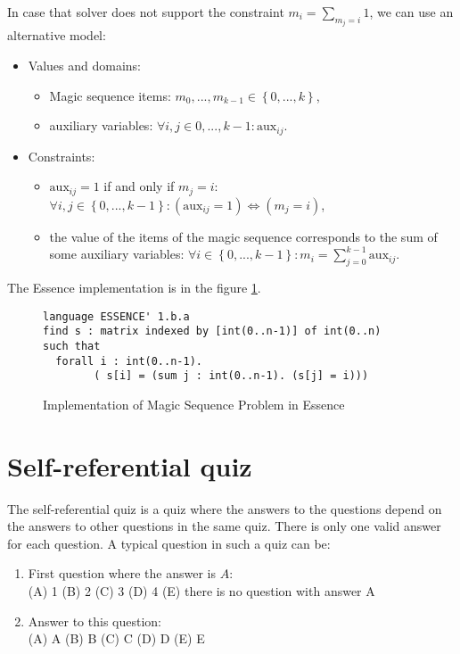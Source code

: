 In case that solver does not support the constraint $m_i = \sum_{m_j = i}{1}$, we 
can use an alternative model: 

\begin{itemize}
	\item Values and domains:
  \begin{itemize} 
	 \item Magic sequence items: $m_0, ..., m_{k-1} \in \left\{0, ..., k\right\}$,
	 \item auxiliary variables: $\forall i,j \in {0, ..., k-1}: \mathrm{aux}_{ij}$.
	\end{itemize}
	\item Constraints:
	 \begin{itemize}
    \item $\mathrm{aux}_{ij} = 1$ if and only if $m_j = i$: $\forall i,j \in \left\{0, ..., k-1\right\}: 
          (\mathrm{aux}_{ij} = 1) \Leftrightarrow (m_j = i)$,
	  \item the value of the items of the magic sequence corresponds to the sum of some auxiliary variables: 
          $\forall i \in \left\{0, ..., k-1\right\}: m_i = \sum_{j=0}^{k-1}{\mathrm{aux}_{ij}}$.
    \end{itemize}
\end{itemize}
The Essence implementation is in the figure \ref{benchmark-essence:mseq}.

\begin{figure}
\caption{\label{benchmark-essence:mseq}Implementation of Magic Sequence Problem in Essence}
\begin{lstlisting}
language ESSENCE' 1.b.a
find s : matrix indexed by [int(0..n-1)] of int(0..n)
such that
  forall i : int(0..n-1).
        ( s[i] = (sum j : int(0..n-1). (s[j] = i)))
\end{lstlisting} 
\end{figure}

\section{Self-referential quiz}

The self-referential quiz is a quiz where the answers to the questions depend on the answers
to other questions in the same quiz. There is only one valid answer for each question.
A typical question in such a quiz can be: 

\begin{enumerate}
  \item First question where the answer is $A$: \\
    (A) 1 (B) 2 (C) 3 (D) 4 (E) there is no question with answer A
  \item Answer to this question: \\ 
    (A) A (B) B (C) C (D) D (E) E
\end{enumerate}

